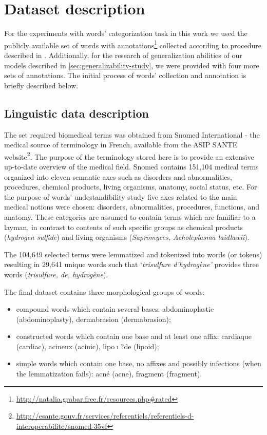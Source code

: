 \chapter{Dataset description}
\label{ch:dataset-description}

For the experiments with words' categorization task in this work we used the publicly available set of words with annotations\footnote{\url{http://natalia.grabar.free.fr/resources.php#rated}} collected according to procedure described in \cite{Grabar-PITR2014}. Additionally, for the research of generalization abilities of our models described in \ref{sec:generalizability-study}, we were provided with four more sets of annotations.
The initial process of words' collection and annotation is briefly described below.

\section{Linguistic data description}
\label{sec:linguistic-data-description}

The set required biomedical terms was obtained from Snomed International \citep{Cote-93} - the medical source of terminology in French, available from the ASIP SANTE website\footnote{\url{http://esante.gouv.fr/services/referentiels/referentiels-d-interoperabilite/snomed-35vf}}. The purpose of the terminology stored here is to provide an extensive up-to-date overview of the medical field. Snomed contains 151,104 medical terms organized into eleven semantic axes such as disorders and abnormalities, procedures, chemical products, living organisms, anatomy, social status, etc. For the purpose of words' undestandibility study five axes related to the main medical notions were chosen: disorders, abnormalities, procedures, functions, and anatomy. These categories are assumed to contain terms which are familiar to a layman, in contrast to contents of such specific groups as chemical products (\textit{hydrogen sulfide}) and living organisms (\textit{Sapromyces, Acholeplasma laidlawii}).

The 104,649 selected terms were lemmatized and tokenized into words (or tokens) resulting in 29,641 unique words such that `\textit{trisulfure d'hydrog\`{e}ne'} provides three words (\textit{trisulfure, de, hydrog\`{e}ne}).

The final dataset contains three morphological groups of words:
\begin{itemize}
    \item  compound words which contain several bases: abdominoplastie (abdominoplasty), dermabrasion (dermabrasion);
    \item  constructed words which contain one base and at least one affix: cardiaque (cardiac), acineux (acinic), lipo$\mathrm{\imath}$?de (lipoid);
    \item  simple words which contain one base, no affixes and possibly infections (when the lemmatization fails): acn\'{e} (acne), fragment (fragment).
\end{itemize}

